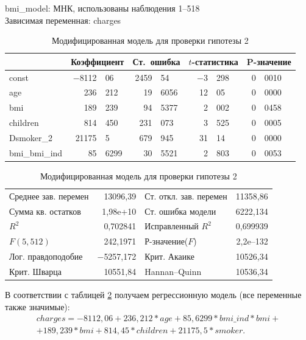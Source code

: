 \documentclass[a4paper,12pt]{article}
\begin{document}
\begin{table}[H]
	\begin{center}
		bmi\_model:
		МНК, использованы наблюдения 1--518\\
		Зависимая переменная: charges\\
		\vspace{1em}
		\begin{tabular}{|l|r@{,}l|r@{,}l|r@{,}l|r@{,}l|}
			\hline
			&
			\multicolumn{2}{c|}{Коэффициент} &
			\multicolumn{2}{c|}{Ст.\ ошибка} &
			\multicolumn{2}{c|}{$t$-статистика} &
			\multicolumn{2}{c|}{P-значение} \\[1ex]
			\hline
			const & $-$8112&06 & 2459&54 & $-$3&298 & 0&0010 \\
			\hline
			age & 236&212 &	19&6056 & 12&05 & 0&0000 \\
			\hline
			bmi & 189&239 & 94&5377 & 2&002 & 0&0458 \\
			\hline
			children & 814&450 & 231&073 & 3&525 & 0&0005 \\
			\hline
			Dsmoker\_2 & 21175&5 & 679&945 & 31&14 & 0&0000 \\
			\hline
			bmi\_bmi\_ind & 85&6299 & 30&5521 &	2&803 &	0&0053 \\
			\hline
		\end{tabular}
		\vspace{1ex}
		\begin{tabular}{lrlr}
			Среднее зав. перемен &  13096,39 & Ст. откл. зав. перемен &  11358,86 \\
			Сумма кв. остатков &  1,98\textrm{e+10} & Ст. ошибка модели &  6222,134 \\
			$R^2$ &  0,702841 & Исправленный $R^2$ &  0,699939 \\
			$F(5, 512)$ &  242,1971 & Р-значение($F$) &  2,2\textrm{e--132} \\
			Лог. правдоподобие & $-$5257,172 & Крит. Акаике &  10526,34 \\
			Крит. Шварца &  10551,84 & Hannan--Quinn &  10536,34 \\
		\end{tabular}
	\end{center}
	\caption{Модифицированная модель для проверки гипотезы 2}
	\label{tab:bmi-model}
\end{table} 

В соответствии с таблицей \ref{tab:bmi-model} получаем регрессионную модель (все переменные также значимые):
\begin{align*}
charges = -8112,06 + 236,212 * age + 85,6299 * bmi\_ind * bmi + \\ + 189,239 * bmi + 814,45 * children + 21175,5 * smoker.
\end{align*}
\end{document}
